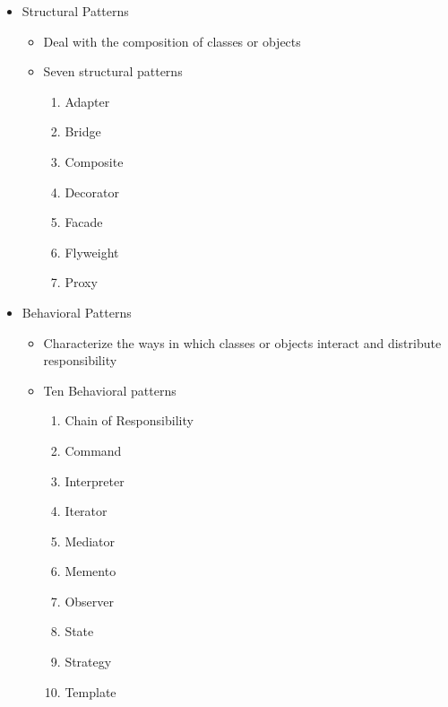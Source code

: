 \documentclass[11pt]{article}
\begin{document}
\begin{itemize}
	\item Structural Patterns
		\begin{itemize}
			\item Deal with the composition of classes or objects
			\item Seven structural patterns\\[-10pt]
				\begin{minipage}[t]{0.25\textwidth}
					\begin{enumerate}
						\item Adapter
						\item Bridge
						\item Composite
						\item Decorator
					\end{enumerate}
				\end{minipage}
				\begin{minipage}[t]{0.4\textwidth}
					\begin{enumerate}
						\setcounter{enumi}{4}
						\item Facade
						\item Flyweight
						\item Proxy
					\end{enumerate}
				\end{minipage}
		\end{itemize}

	\item Behavioral Patterns
		\begin{itemize}
			\item Characterize the ways in which classes or objects interact and distribute responsibility
			\item Ten Behavioral patterns\\[-10pt]
			\begin{minipage}[t]{0.4\textwidth}
				\begin{enumerate}
					\item Chain of Responsibility
					\item Command
					\item Interpreter
					\item Iterator
					\item Mediator
				\end{enumerate}
			\end{minipage}
			\begin{minipage}[t]{0.4\textwidth}
				\begin{enumerate}
					\setcounter{enumi}{5}
					\item Memento
					\item Observer
					\item State
					\item Strategy
					\item Template
				\end{enumerate}
			\end{minipage}
		\end{itemize}


\end{itemize}
\end{document}

